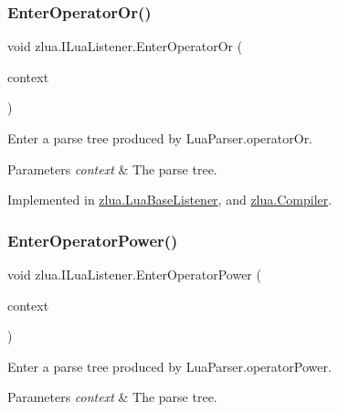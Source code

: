 \subsubsection{\texorpdfstring{Enter\+Operator\+Or()}{EnterOperatorOr()}}
{\footnotesize\ttfamily void zlua.\+I\+Lua\+Listener.\+Enter\+Operator\+Or (\begin{DoxyParamCaption}\item[{\mbox{[}\+Not\+Null\mbox{]} \mbox{\hyperlink{classzlua_1_1_lua_parser_1_1_operator_or_context}{Lua\+Parser.\+Operator\+Or\+Context}}}]{context }\end{DoxyParamCaption})}



Enter a parse tree produced by Lua\+Parser.\+operator\+Or. 


\begin{DoxyParams}{Parameters}
{\em context} & The parse tree.\\
\hline
\end{DoxyParams}


Implemented in \mbox{\hyperlink{classzlua_1_1_lua_base_listener_afc55e8820e1e62e135f4c2fd0d69825d}{zlua.\+Lua\+Base\+Listener}}, and \mbox{\hyperlink{classzlua_1_1_compiler_a75f93e717dd16160d39907f826257579}{zlua.\+Compiler}}.

\mbox{\label{interfacezlua_1_1_i_lua_listener_ac3dc9682198e2059e103552b21ef1a9c}} 
\subsubsection{\texorpdfstring{Enter\+Operator\+Power()}{EnterOperatorPower()}}
{\footnotesize\ttfamily void zlua.\+I\+Lua\+Listener.\+Enter\+Operator\+Power (\begin{DoxyParamCaption}\item[{\mbox{[}\+Not\+Null\mbox{]} \mbox{\hyperlink{classzlua_1_1_lua_parser_1_1_operator_power_context}{Lua\+Parser.\+Operator\+Power\+Context}}}]{context }\end{DoxyParamCaption})}



Enter a parse tree produced by Lua\+Parser.\+operator\+Power. 


\begin{DoxyParams}{Parameters}
{\em context} & The parse tree.\\
\hline
\end{DoxyParams}


